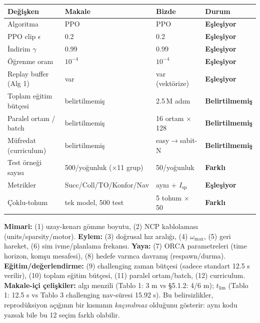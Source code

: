 \documentclass[11pt,a4paper]{article}
\newcommand{\msp}{I_{\mathrm{sp}}}
\newcommand{\dmatch}{\textcolor{cgreen}{\textbf{Eşleşiyor}}}
\newcommand{\ddiff}{\textcolor{cred}{\textbf{Farklı}}}
\newcommand{\dunspec}{\textcolor{camber}{\textbf{Belirtilmemiş}}}
\begin{document}
\begin{table}[H]
\centering\small
\begin{tabular}{@{}p{3.2cm}p{4.0cm}p{4.4cm}l@{}}
\toprule
\textbf{Değişken} & \textbf{Makale} & \textbf{Bizde} & \textbf{Durum} \\
\midrule
Algoritma & PPO & PPO & \dmatch \\
PPO clip $\epsilon$ & 0.2 & 0.2 & \dmatch \\
İndirim $\gamma$ & 0.99 & 0.99 & \dmatch \\
Öğrenme oranı & $10^{-4}$ & $10^{-4}$ & \dmatch \\
Replay buffer (Alg 1) & var & var (vektörize) & \dmatch \\
Toplam eğitim bütçesi & belirtilmemiş & 2.5\,M adım & \dunspec \\
Paralel ortam / batch & belirtilmemiş & 16 ortam $\times$ 128 & \dunspec \\
Müfredat (curriculum) & belirtilmemiş & easy$\rightarrow$sabit-N & \dunspec \\
Test örneği sayısı & 500/yoğunluk ($\times$11 grup) & 50/yoğunluk & \ddiff \\
Metrikler & Succ/Coll/TO/Konfor/Nav & aynı + $\msp$ & \dmatch \\
Çoklu-tohum & tek model, 500 test & 5 tohum $\times$ 50 & \ddiff \\
\bottomrule
\end{tabular}
\end{table}

\begin{uyari}
\textbf{Mimari:} (1) uzay-kenarı gömme boyutu, (2) NCP kablolaması (units/sparsity/motor).
\textbf{Eylem:} (3) doğrusal hız aralığı, (4) $\omega_{\max}$, (5) geri hareket, (6) sim ivme/planlama frekansı.
\textbf{Yaya:} (7) ORCA parametreleri (time horizon, komşu mesafesi), (8) hedefe varınca davranış (respawn/durma).
\textbf{Eğitim/değerlendirme:} (9) challenging zaman bütçesi (sadece standart 12.5 s verilir), (10) toplam
eğitim bütçesi, (11) paralel ortam/batch, (12) curriculum.
\textbf{Makale-içi çelişkiler:} algı menzili (Tablo 1: 3 m vs \S5.1.2: 4/6 m); $t_{\lim}$ (Tablo 1: 12.5 s vs
Tablo 3 challenging nav-süresi 15.92 s). Bu belirsizlikler, reprodüksiyon açığının bir kısmının
\emph{kaçınılmaz} olduğunu gösterir: aynı kodu yazsak bile bu 12 seçim farklı olabilir.
\end{uyari}

\end{document}
